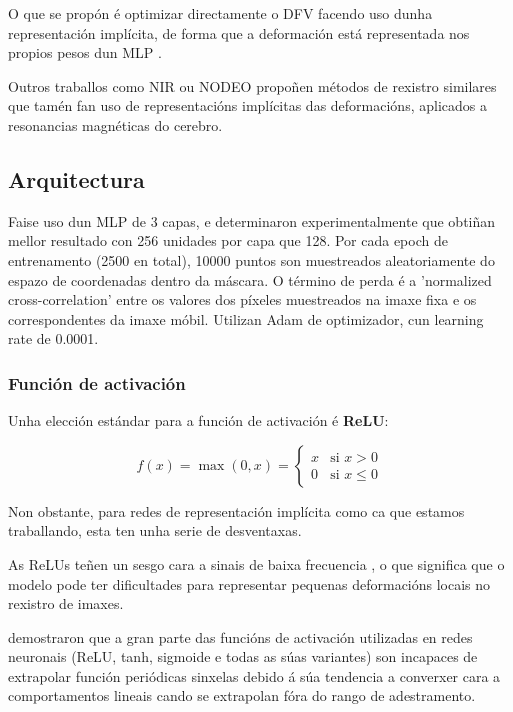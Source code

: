 O que se propón é optimizar directamente o DFV facendo uso dunha representación implícita, de forma que a deformación está representada nos propios pesos dun MLP \cite{wolterink2021implicit}.

Outros traballos como NIR \cite{sun2024medicalimageregistrationneural} ou NODEO \cite{nodeo} propoñen métodos de rexistro similares que tamén fan uso de representacións implícitas das deformacións, aplicados a resonancias magnéticas do cerebro.

\subsection{Arquitectura}
\label{subsubsec:Arquitectura}

Faise uso dun MLP de 3 capas, e determinaron experimentalmente que obtiñan mellor resultado con 256 unidades por capa que 128.
Por cada epoch de entrenamento (2500 en total), 10000 puntos son muestreados aleatoriamente do espazo de coordenadas dentro da máscara.
O término de perda é a 'normalized cross-correlation' entre os valores dos píxeles muestreados na imaxe fixa e os correspondentes da imaxe móbil.
Utilizan Adam de optimizador, cun learning rate de 0.0001.

\subsubsection{Función de activación}
\label{subsubsec:Función de activación}

Unha elección estándar para a función de activación é \textbf{ReLU}:

\[
f(x) = \max(0, x) = \begin{cases} 
x & \text{si } x > 0 \\ 
0 & \text{si } x \leq 0 
\end{cases}
\]

Non obstante, para redes de representación implícita como ca que estamos traballando, esta ten unha serie de desventaxas.

As ReLUs teñen un sesgo cara a sinais de baixa frecuencia \cite{rahaman2019spectralbiasneuralnetworks}, 
 o que significa que o modelo pode ter dificultades para representar pequenas deformacións locais no rexistro de imaxes.
 
\cite{ziyin2020neuralnetworksfaillearn} demostraron que a gran parte das funcións de activación utilizadas en redes neuronais (ReLU, tanh, sigmoide e todas as súas variantes)
son incapaces de extrapolar función periódicas sinxelas debido á súa tendencia a converxer cara a comportamentos lineais cando se extrapolan fóra do rango de adestramento. 

